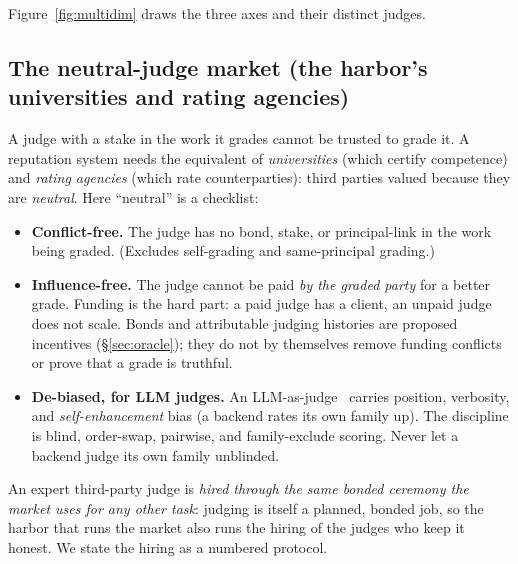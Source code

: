 \documentclass[11pt,a4paper]{article}
\theoremstyle{definition}
\newcounter{protocol}[section]
\begin{document}
Figure~\ref{fig:multidim} draws the three axes and their distinct judges.


\subsection{The neutral-judge market (the harbor's universities and rating agencies)}

A judge with a stake in the work it grades cannot be trusted to grade it. A
reputation system needs the equivalent of \emph{universities} (which certify
competence) and \emph{rating agencies} (which rate counterparties): third
parties valued because they are \emph{neutral}. Here ``neutral'' is a
checklist:

\begin{itemize}[leftmargin=1.4em]
  \item \textbf{Conflict-free.} The judge has no bond, stake, or principal-link in
  the work being graded. (Excludes self-grading and same-principal grading.)
  \item \textbf{Influence-free.} The judge cannot be paid \emph{by the graded
  party} for a better grade. Funding is the hard part: a paid judge has a client,
  an unpaid judge does not scale. Bonds and attributable judging histories are proposed incentives
  (\S\ref{sec:oracle}); they do not by themselves remove funding conflicts
  or prove that a grade is truthful.
  \item \textbf{De-biased, for LLM judges.} An LLM-as-judge~
  carries position, verbosity, and \emph{self-enhancement} bias (a backend rates
  its own family up). The discipline is blind, order-swap, pairwise, and
  family-exclude scoring. Never let a backend judge its own family unblinded.
\end{itemize}

\noindent An expert third-party judge is \emph{hired through the same
bonded ceremony the market uses for any other task}: judging is itself a planned,
bonded job, so the harbor that runs the market also runs the hiring of the judges
who keep it honest. We state the hiring as a numbered protocol.
\end{document}
